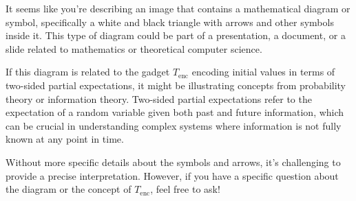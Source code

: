 It seems like you're describing an image that contains a mathematical diagram or symbol, specifically a white and black triangle with arrows and other symbols inside it. This type of diagram could be part of a presentation, a document, or a slide related to mathematics or theoretical computer science.

If this diagram is related to the gadget \(T_{\text{enc}}\) encoding initial values in terms of two-sided partial expectations, it might be illustrating concepts from probability theory or information theory. Two-sided partial expectations refer to the expectation of a random variable given both past and future information, which can be crucial in understanding complex systems where information is not fully known at any point in time.

Without more specific details about the symbols and arrows, it's challenging to provide a precise interpretation. However, if you have a specific question about the diagram or the concept of \(T_{\text{enc}}\), feel free to ask!
